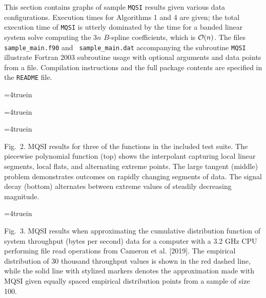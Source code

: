 
This section contains graphs of sample {\tt MQSI} results given various
data configurations. Execution times for Algorithms 1 and 4 are given; the
total execution time of {\tt MQSI} is utterly dominated by the time for a
banded linear system solve computing the $3n$ $B$-spline coefficients,
which is ${\cal O}(n)$.  The files {\tt sample\_main.f90} and {\tt
sample\_main.dat} accompanying the subroutine {\tt MQSI} illustrate Fortran
2003 subroutine usage with optional arguments and data points from a file.
Compilation instructions and the full package contents are specified in
the {\tt README} file.

\topinsert
\centerline{\epsfxsize=4truein }
\centerline{\epsfxsize=4truein }
\centerline{\epsfxsize=4truein }
{\narrower\noindent\rmVIII Fig.\ 2.
{\ttVIII MQSI} results for three of the functions in the included test
suite. The {\itVIII piecewise polynomial} function (top) shows the
interpolant capturing local linear segments, local flats, and
alternating extreme points. The {\itVIII large tangent} (middle)
problem demonstrates outcomes on rapidly changing segments of data.
The {\itVIII signal decay} (bottom) alternates between extreme values
of steadily decreasing magnitude.
\par}
\vskip 6mm
\centerline{\epsfxsize=4truein }
{\narrower\noindent\rmVIII Fig.\ 3.
{\ttVIII MQSI} results when approximating the cumulative distribution
function of system throughput (bytes per second) data for a computer
with a 3.2 GHz CPU performing file read operations from Cameron et al.
[2019]. The empirical distribution of 30 thousand throughput values is
shown in the red dashed line, while the solid line with stylized
markers denotes the approximation made with MQSI given equally spaced
empirical distribution points from a sample of size 100.
\par}
\endinsert

